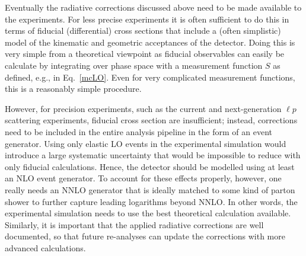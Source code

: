
Eventually the radiative corrections discussed above need to be made available to the experiments.
For less precise experiments it is often sufficient to do this in terms of fiducial (differential) cross sections that include a (often simplistic) model of the kinematic and geometric acceptances of the detector.
Doing this is very simple from a theoretical viewpoint as fiducial observables can easily be calculate by integrating over phase space with a measurement function $S$ as defined, e.g., in Eq.~\ref{mcLO}.
Even for very complicated measurement functions, this is a reasonably simple procedure.

However, for precision experiments, such as the current and next-generation $\ell p$ scattering experiments, fiducial cross section are insufficient; instead, corrections need to be included in the entire analysis pipeline in the form of an event generator.
Using only elastic LO events in the experimental simulation would introduce a large systematic uncertainty that would be impossible to reduce with only fiducial calculations.
Hence, the detector should be modelled using at least an NLO event generator.
To account for these effects properly, however, one really needs an NNLO generator that is ideally matched to some kind of parton shower to further capture leading logarithms beyond NNLO.
In other words, the experimental simulation needs to use the best theoretical calculation available. Similarly, it is important that the applied radiative corrections are well documented, so that future re-analyses can update the corrections with more advanced calculations.




